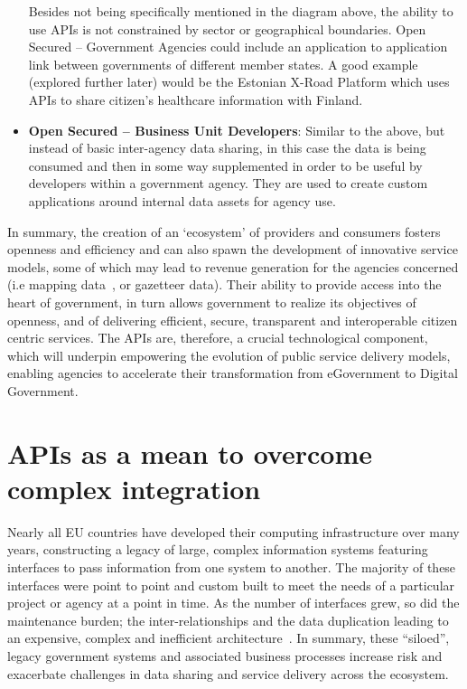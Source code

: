 \begin{itemize}
	 Besides not being specifically mentioned in the diagram above, the ability to use
	 APIs is not constrained by sector or geographical boundaries. Open Secured
	 – Government Agencies could include an application to application link
	 between governments of different member states. A good example (explored
	 further later) would be the Estonian X-Road Platform which uses APIs to
	 share citizen’s healthcare information with Finland.
	 
	 \item \textbf{Open Secured – Business Unit Developers}: Similar to the above, but
	 instead of basic inter-agency data sharing, in this case the data is being
	 consumed and then in some way supplemented in order to be useful by developers
	 within a government agency. They are used to create custom applications around
	 internal data assets for agency use.
\end{itemize}

In summary, the creation of an ‘ecosystem’ of providers and consumers fosters
openness and efficiency and can also spawn the development of innovative service
models, some of which may lead to revenue generation for the agencies concerned
(i.e mapping data~\citep{os_places}, or gazetteer data). Their ability to provide access
into the heart of government, in turn allows government to realize its objectives
of openness, and of delivering efficient, secure, transparent and interoperable
citizen centric services. The APIs are, therefore, a crucial technological
component, which will underpin empowering the evolution of public service delivery
models, enabling agencies to accelerate their transformation from eGovernment to
Digital Government.

\section{APIs as a mean to overcome complex integration}

Nearly all EU countries have developed their computing infrastructure over
many years, constructing a legacy of large, complex information systems featuring
interfaces to pass information from one system to another. The majority of these
interfaces were point to point and custom built to meet the needs of a particular
project or agency at a point in time. As the number of interfaces grew, so did the
maintenance burden; the inter-relationships and the data duplication leading to an
expensive, complex and inefficient architecture~\citep{deloitte_insights}. In summary, these
“siloed”, legacy government systems and associated business processes increase
risk and exacerbate challenges in data sharing and service delivery across the
ecosystem.

